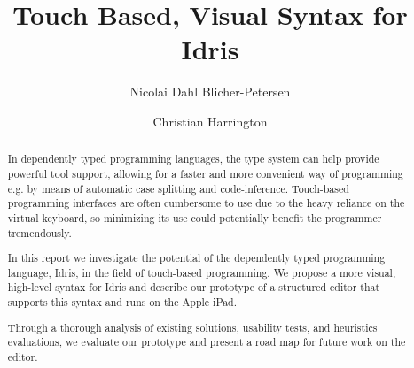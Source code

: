 \documentclass[oribibl]{llncs}
\begin{document}
\mainmatter{}
\title{Touch Based, Visual Syntax for Idris}
\author{Nicolai Dahl Blicher-Petersen \and Christian Harrington \\
}

\maketitle

\begin{abstract}
In dependently typed programming languages, the type system can help provide powerful tool support, allowing for a faster and more
convenient way of programming e.g. by means of automatic case splitting and code-inference. Touch-based programming interfaces are often
cumbersome to use due to the heavy reliance on the virtual keyboard, so
minimizing its use could potentially benefit the programmer tremendously.

In this report we investigate the potential of the dependently typed
programming language, Idris, in the field of touch-based programming.
We propose a more visual, high-level syntax for Idris and describe our prototype of a structured editor
that supports this syntax and runs on the Apple iPad.

Through a thorough analysis of existing solutions, usability tests, and
heuristics evaluations, we evaluate our prototype and present a road map for
future work on the editor.


\end{abstract}











\newpage

\end{document}
